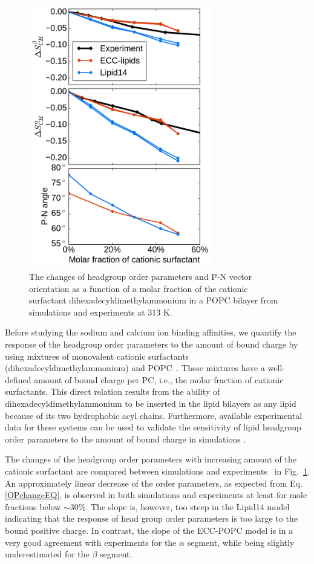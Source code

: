 \documentclass[aip,jcp,twocolumn]{revtex4}
\begin{document}
\begin{figure}[tb!]
  \centering
  \includegraphics[width=8.0cm]{../Fig/ipython_nb/PN_angle_OrdPars-A-B_L14-ECCL17_q80_sig89_surf.pdf}
  \caption{\label{OrderParameterCHANGESsurf}
    The changes of headgroup order parameters and P-N vector orientation as a function of
    a molar fraction of the cationic surfactant dihexadecyldimethylammonium in a POPC bilayer
    from simulations and experiments \cite{scherer89} at 313 K.
  }
\end{figure}

Before studying the sodium and calcium ion binding affinities, we quantify the response of the headgroup order parameters to the amount of bound charge by using mixtures of monovalent cationic surfactants (dihexadecyldimethylammonium) and POPC~\cite{scherer89}. These mixtures have a well-defined amount of bound charge per PC, i.e., the molar fraction of cationic surfactants. This direct relation results from the ability of dihexadecyldimethylammonium to be inserted in the lipid bilayers as any lipid because of its two hydrophobic acyl chains. Furthermore, available experimental data for these systems can be used to validate the sensitivity of lipid headgroup order parameters to the amount of bound charge in simulations \cite{scherer89}.

The changes of the headgroup order parameters with increasing amount of the cationic surfactant are compared between simulations and experiments~\cite{scherer89} in Fig.~\ref{OrderParameterCHANGESsurf}. An approximately linear decrease of the order parameters, as expected from Eq. \ref{OPchangeEQ}, is observed in both simulations and experiments at least for mole fractions below $\sim$30\%. The slope is, however, too steep in the Lipid14 model indicating that the response of head group order parameters is too large to the bound positive charge. In contrast, the slope of the ECC-POPC model is in a very good agreement with experiments for the $\alpha$ segment, while being slightly underestimated for the $\beta$ segment.
\end{document}

